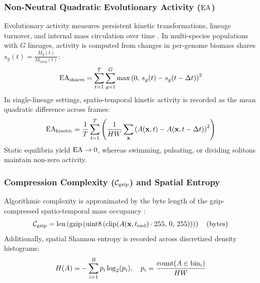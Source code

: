 \subsubsection{\texorpdfstring{Non-Neutral Quadratic Evolutionary Activity ($\text{EA}$)}{Non-Neutral Quadratic Evolutionary Activity}}
Evolutionary activity measures persistent kinetic transformations, lineage turnover, and internal mass circulation over time \parencite{bedau2019openended}. In multi-species populations with $G$ lineages, activity is computed from changes in per-genome biomass shares $s_g(t) = \frac{M_g(t)}{M_{\text{total}}(t)}$:
\begin{equation}
\text{EA}_{\text{shares}} = \sum_{t=1}^{T} \sum_{g=1}^{G} \max\left(0, \, s_g(t) - s_g(t - \Delta t)\right)^2
\label{eq:evolutionary_activity_shares}
\end{equation}
In single-lineage settings, spatio-temporal kinetic activity is recorded as the mean quadratic difference across frames:
\begin{equation}
\text{EA}_{\text{kinetic}} = \frac{1}{T} \sum_{t=1}^{T} \left( \frac{1}{HW} \sum_{\mathbf{x}} \left( A(\mathbf{x}, t) - A(\mathbf{x}, t - \Delta t) \right)^2 \right)
\label{eq:evolutionary_activity_metric}
\end{equation}
Static equilibria yield $\text{EA} \to 0$, whereas swimming, pulsating, or dividing solitons maintain non-zero activity.

\subsubsection{\texorpdfstring{Compression Complexity ($\mathcal{C}_{\text{gzip}}$) and Spatial Entropy}{Compression Complexity and Spatial Entropy}}
Algorithmic complexity is approximated by the byte length of the gzip-compressed spatio-temporal mass occupancy \parencite{cisneros2019evolving}:
\begin{equation}
\mathcal{C}_{\text{gzip}} = \text{len}\left( \text{gzip}\left( \text{uint8}\left(\text{clip}(A(\mathbf{x}, t_{\text{end}}) \cdot 255, \, 0, \, 255)\right) \right) \right) \quad (\text{bytes})
\label{eq:compression_complexity}
\end{equation}
Additionally, spatial Shannon entropy is recorded across discretized density histograms:
\begin{equation}
H(A) = -\sum_{i=1}^{B} p_i \log_2(p_i), \quad p_i = \frac{\text{count}(A \in \text{bin}_i)}{HW}
\label{eq:spatial_entropy}
\end{equation}

